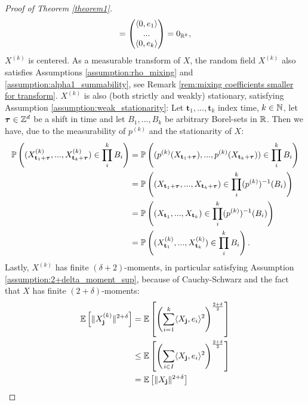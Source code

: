 \begin{proof}[Proof of Theorem \ref{theorem1}]
\begin{align*}
         =  \begin{pmatrix} \langle 0, e_1 \rangle \\ ... \\ \langle 0, e_k \rangle \end{pmatrix} %
         =  0_{\RR^k},
    \end{align*}
    $X^{(k)}$ is centered. As a measurable transform of $X$, the random field $X^{(k)}$ also satisfies Assumptions \ref{assumption:rho_mixing} and \ref{assumption:alpha1_summability}, see Remark \ref{rem:mixing coefficients smaller for transform}.
    $X^{(k)}$ is also (both strictly and weakly) stationary, satisfying Assumption \ref{assumption:weak_stationarity}: Let $\mathbf{t}_1, ..., \mathbf{t}_k$ index time, $k \in \mathbb{N}$, let ${\boldsymbol{\tau}} \in \mathbb{Z}^d$ be a shift in time and let $B_1, ..., B_k$ be arbitrary Borel-sets in $\mathbb{R}$. Then we have, due to the measurability of $p^{(k)}$ and the stationarity of $X$:
    \begin{align*}
        \mathbb{P}\left( (X^{(k)}_{\mathbf{t}_1+{\boldsymbol{\tau}}}, ..., X^{(k)}_{\mathbf{t}_k+{\boldsymbol{\tau}}}) \in \prod\limits_{i}^k B_i \right)
        & = \mathbb{P}\left( (p^{(k)}(X_{\mathbf{t}_1+{\boldsymbol{\tau}}}), ..., p^{(k)}(X_{\mathbf{t}_k+{\boldsymbol{\tau}}})) \in \prod\limits_{i}^k B_i \right) \\
        & = \mathbb{P}\left( (X_{\mathbf{t}_1+{\boldsymbol{\tau}}}, ..., X_{\mathbf{t}_k+{\boldsymbol{\tau}}}) \in \prod\limits_{i}^k (p^{(k)})^{-1}(B_i) \right) \\
        & = \mathbb{P}\left( (X_{\mathbf{t}_1}, ..., X_{\mathbf{t}_k}) \in \prod\limits_{i}^k (p^{(k)})^{-1}(B_i) \right) \\
        & = \mathbb{P}\left( (X^{(k)}_{\mathbf{t}_1}, ..., X^{(k)}_{\mathbf{t}_k}) \in \prod\limits_{i}^k B_i \right).
    \end{align*}
    Lastly, $X^{(k)}$ has finite $(\delta+2)$-moments, in particular satisfying Assumption \ref{assumption:2+delta_moment_sup}, because of Cauchy-Schwarz and the fact that $X$ has finite $(2+\delta)$-moments:
    \begin{align*}
        \EE{\|X^{(k)}_\mathbf{j}\|^{2+\delta}} 
        & = \EE{\left( \sum\limits_{i=1}^k \langle X_\mathbf{j}, e_i \rangle^2 \right)^{\frac{2+\delta}{2}}} \\
        & \leq \EE{\left( \sum\limits_{i \in I} \langle X_\mathbf{j}, e_i \rangle^2 \right)^{\frac{
        2+\delta}{2}}} \\
        & = \EE{\|X_\mathbf{j}\|^{2+\delta}} \\

\end{align*}
\end{proof}
